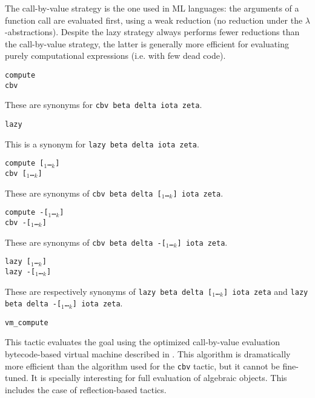 \begin{coq_example*}
The call-by-value strategy is the one used in ML languages: the
arguments of a function call are evaluated first, using a weak
reduction (no reduction under the $\lambda$-abstractions). Despite the
lazy strategy always performs fewer reductions than the call-by-value
strategy, the latter is generally more efficient for evaluating purely
computational expressions (i.e. with few dead code).

\begin{Variants}
\item {\tt compute} \\
      {\tt cbv}

  These are synonyms for {\tt cbv beta delta iota zeta}.

\item {\tt lazy}

  This is a synonym for {\tt lazy beta delta iota zeta}.

\item {\tt compute [\qualid$_1$\ldots\qualid$_k$]}\\
      {\tt cbv [\qualid$_1$\ldots\qualid$_k$]}

  These are synonyms of {\tt cbv beta delta
  [\qualid$_1$\ldots\qualid$_k$] iota zeta}.

\item {\tt compute -[\qualid$_1$\ldots\qualid$_k$]}\\
      {\tt cbv -[\qualid$_1$\ldots\qualid$_k$]}

  These are synonyms of {\tt cbv beta delta
  -[\qualid$_1$\ldots\qualid$_k$] iota zeta}.

\item {\tt lazy [\qualid$_1$\ldots\qualid$_k$]}\\
      {\tt lazy -[\qualid$_1$\ldots\qualid$_k$]}

  These are respectively synonyms of {\tt lazy beta delta
  [\qualid$_1$\ldots\qualid$_k$] iota zeta} and {\tt lazy beta delta
  -[\qualid$_1$\ldots\qualid$_k$] iota zeta}.

\item {\tt vm\_compute} 

  This tactic evaluates the goal using the optimized call-by-value evaluation
  bytecode-based virtual machine described in
  \cite{CompiledStrongReduction}. This algorithm is dramatically more efficient
  than the algorithm used for the {\tt cbv} tactic, but it cannot be
  fine-tuned. It is specially interesting for full evaluation of algebraic
  objects. This includes the case of reflection-based tactics.


\end{Variants}
\end{coq_example*}
